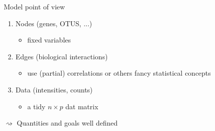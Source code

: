 \begin{frame}
\begin{columns}[c]
\begin{column}{.55\textwidth}
    \end{column}
    \begin{column}{.475\textwidth} 
      \begin{block}{Model point of view}
        \vspace{-.25cm}
        \begin{footnotesize}
            \begin{enumerate}
            \item \alert{Nodes} (genes, OTUS, ...)
              \begin{scriptsize}
                \begin{itemize}
                \item \scriptsize fixed variables
                \end{itemize}
              \end{scriptsize}
            \item \alert{Edges} (biological interactions)
              \begin{scriptsize}
                \begin{itemize}
                \item \scriptsize use (partial) correlations or others
                  fancy statistical concepts
                \end{itemize}
              \end{scriptsize}
            \item \alert{Data} (intensities, counts)
              \begin{scriptsize}
                \begin{itemize}
                \item \scriptsize a tidy $n\times p$ dat matrix
                \end{itemize}
              \end{scriptsize}
            \end{enumerate}
            \vspace{-.25cm}
            $\rightsquigarrow$ \alert{Quantities and goals well defined}
          \end{footnotesize}
          \end{block}
    \end{column}
  \end{columns}


\end{frame}
